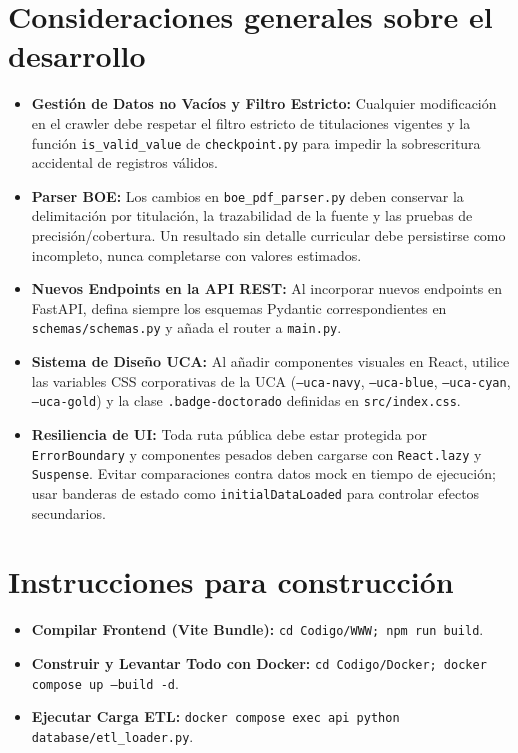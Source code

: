 \section{Consideraciones generales sobre el desarrollo}
\begin{itemize}
    \item \textbf{Gestión de Datos no Vacíos y Filtro Estricto:} Cualquier modificación en el crawler debe respetar el filtro estricto de titulaciones vigentes y la función \texttt{is\_valid\_value} de \texttt{checkpoint.py} para impedir la sobrescritura accidental de registros válidos.
    \item \textbf{Parser BOE:} Los cambios en \texttt{boe\_pdf\_parser.py} deben conservar la delimitación por titulación, la trazabilidad de la fuente y las pruebas de precisión/cobertura. Un resultado sin detalle curricular debe persistirse como incompleto, nunca completarse con valores estimados.
    \item \textbf{Nuevos Endpoints en la API REST:} Al incorporar nuevos endpoints en FastAPI, defina siempre los esquemas Pydantic correspondientes en \texttt{schemas/schemas.py} y añada el router a \texttt{main.py}.
    \item \textbf{Sistema de Diseño UCA:} Al añadir componentes visuales en React, utilice las variables CSS corporativas de la UCA (\texttt{--uca-navy}, \texttt{--uca-blue}, \texttt{--uca-cyan}, \texttt{--uca-gold}) y la clase \texttt{.badge-doctorado} definidas en \texttt{src/index.css}.
    \item \textbf{Resiliencia de UI:} Toda ruta pública debe estar protegida por \texttt{ErrorBoundary} y componentes pesados deben cargarse con \texttt{React.lazy} y \texttt{Suspense}. Evitar comparaciones contra datos mock en tiempo de ejecución; usar banderas de estado como \texttt{initialDataLoaded} para controlar efectos secundarios.
\end{itemize}

\section{Instrucciones para construcción}
\begin{itemize}
    \item \textbf{Compilar Frontend (Vite Bundle):} \texttt{cd Codigo/WWW; npm run build}.
    \item \textbf{Construir y Levantar Todo con Docker:} \texttt{cd Codigo/Docker; docker compose up --build -d}.
    \item \textbf{Ejecutar Carga ETL:} \texttt{docker compose exec api python database/etl\_loader.py}.
\end{itemize}

